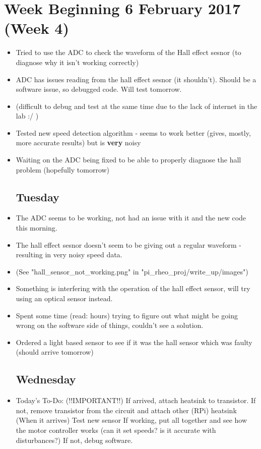 \documentclass[a4]{report}
\begin{document}
	\section{Week Beginning 6 February 2017 (Week 4)}
	\begin{itemize}
		\subsection*{Monday}
		\item Tried to use the ADC to check the waveform of the Hall effect sesnor (to diagnose why it isn't working correctly)
		\item ADC has issues reading from the hall effect sesnor (it shouldn't). Should be a software issue, so debugged code. Will test tomorrow.
		\item (difficult to debug and test at the same time due to the lack of internet in the lab :/ )
		\item Tested new speed detection algorithm - seems to work better (gives, mostly, more accurate results) but is \textbf{very} noisy
		\item Waiting on the ADC being fixed to be able to properly diagnose the hall problem (hopefully tomorrow)
		\subsection*{Tuesday}
		\item The ADC seems to be working, not had an issue with it and the new code this morning.
		\item The hall effect sesnor doesn't seem to be giving out a regular waveform - resulting in very noisy speed data.
		\item (See "hall\_sensor\_not\_working.png" in "pi\_rheo\_proj/write\_up/images")
		\item Something is interfering with the operation of the hall effect sensor, will try using an optical sensor instead.
		\item Spent some time (read: hours) trying to figure out what might be going wrong on the software side of things, couldn't see a solution.
		\item Ordered a light based sensor to see if it was the hall sensor which was faulty (should arrive tomorrow)
		\subsection*{Wednesday}
		\item Today's To-Do:
		\subitem (!!IMPORTANT!!) If arrived, attach heatsink to transistor. If not, remove transistor from the circuit and attach other (RPi) heatsink
		\subitem (When it arrives) Test new sensor
		\subitem If working, put all together and see how the motor controller works (can it set speeds? is it accurate with disturbances?)
		\subitem If not, debug software.
	\end{itemize}
	\newpage
\end{document}
